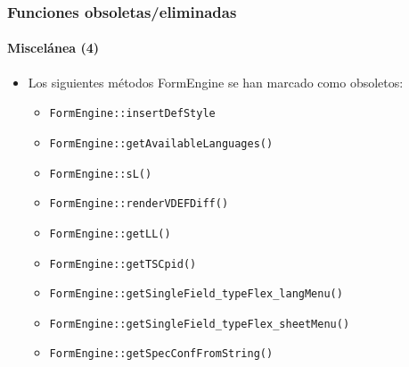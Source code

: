 \begin{frame}[fragile]
	\frametitle{Funciones obsoletas/eliminadas}
	\framesubtitle{Miscelánea (4)}

	\begin{itemize}
		\item Los siguientes métodos FormEngine se han marcado como obsoletos:
		\begin{itemize}
			\item \texttt{FormEngine::insertDefStyle}
			\item \texttt{FormEngine::getAvailableLanguages()}
			\item \texttt{FormEngine::sL()}
			\item \texttt{FormEngine::renderVDEFDiff()}
			\item \texttt{FormEngine::getLL()}
 			\item \texttt{FormEngine::getTSCpid()}
 			\item \texttt{FormEngine::getSingleField\_typeFlex\_langMenu()}
 			\item \texttt{FormEngine::getSingleField\_typeFlex\_sheetMenu()}
 			\item \texttt{FormEngine::getSpecConfFromString()}
 		\end{itemize}
	\end{itemize}

\end{frame}

